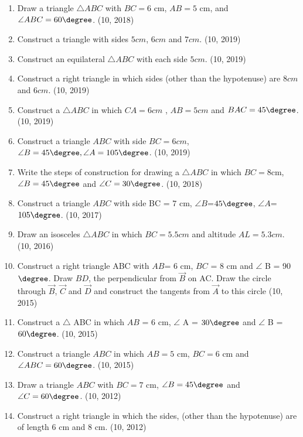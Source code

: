 \begin{enumerate}[label=\thesubsection.\arabic*,ref=\thesubsection.\theenumi]
    \item Draw a triangle $\triangle ABC$ with $BC = 6 \text{ cm}$, $AB = 5 \text{ cm}$, and $\angle ABC = 60\degree$.  \hfill (10, 2018)
\item Construct a triangle with sides $5cm$, $6cm$ and $7cm$. 
		\hfill (10, 2019)
\item Construct an equilateral $\triangle ABC$ with each side $5 cm$. 
		\hfill (10, 2019)
\item Construct a right triangle in which sides (other than the hypotenuse) are $8 cm$ and $6 cm$. 
		\hfill (10, 2019)

\item Construct a $\triangle ABC$ in which $CA = 6cm$ , $AB = 5cm$ and $BAC= 45\degree$. 
		\hfill (10, 2019)
\item Construct a triangle $ABC$ with side $BC = 6 cm$, $\angle B=45\degree, \angle A= 105\degree$. 
		\hfill (10, 2019)
\item Write the steps of construction for drawing a $\triangle ABC$ in which $BC=8$cm, $\angle B=45\degree$ and $\angle C= 30\degree$. 
		\hfill (10, 2018)
\item Construct a triangle $ABC$ with side BC = $7$ cm, $\angle{B}$=$45\degree$, $\angle{A}$=$105\degree$. 
		\hfill (10, 2017)
\item Draw an isosceles $\triangle ABC$ in which $BC=5.5 cm$ and altitude $AL=5.3 cm$. 
		\hfill (10, 2016)
     \item Construct a right triangle ABC with $AB$= $6$ cm, $BC$ = $8$ cm and $\angle$ B = 90$\degree$. Draw $BD$, the perpendicular from $\vec{B}$ on AC. Draw the circle through $\vec{B}$, $\vec{C}$ and $\vec{D}$ and construct the tangents from $\vec{A}$ to this circle
		\hfill (10, 2015)

     \item Construct a $\triangle$ ABC in which  $AB$ = $6$ cm, $\angle$ A = $30\degree $ and $\angle$ B = $60\degree$. 
		\hfill (10, 2015)
\item Construct a triangle $ABC$ in which $AB = 5$ cm, $BC = 6$ cm and $\angle ABC = 60\degree$. 
		\hfill (10, 2015)
\item Draw a triangle $ABC$ with $BC = 7 \text{ cm}$, $\angle B = 45 \degree$ and $\angle C = 60 \degree$. 
		\hfill (10, 2012)
\item Construct a right triangle in which the sides, (other than the hypotenuse) are of length $6\text{ cm}$ and $8\text{ cm}$. 
		\hfill (10, 2012)
\end{enumerate}
